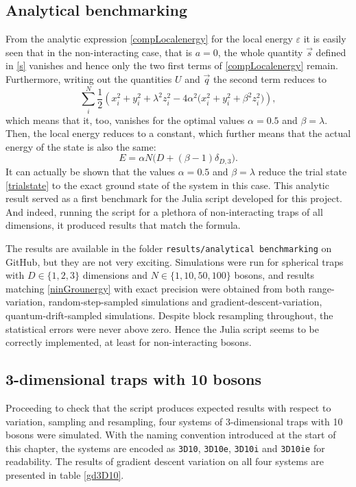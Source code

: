 \documentclass[a4paper,8pt]{article}
\begin{document}
\begin{multicols}{2}
\subsection{Analytical benchmarking}\label{benchmarking}
From the analytic expression \eqref{compLocalenergy} for the local energy $\varepsilon$ it is easily seen that in the non-interacting case, that is $a = 0$, the whole quantity $\vec{s}$ defined in \eqref{s} vanishes and hence only the two first terms of \eqref{compLocalenergy} remain. Furthermore, writing out the quantities $U$ and $\vec{q}$ the second term reduces to
\begin{equation}\nonumber
	\sum_i^N \frac{1}{2}\left(x^2_i+y^2_i+\lambda^2z^2_i-4\alpha^2\Big(x^2_i+y^2_i+\beta^2z_i^2\Big)\right),
\end{equation}
which means that it, too, vanishes for the optimal values $\alpha = 0.5$ and $\beta = \lambda$. Then, the local energy reduces to a constant, which further means that the actual energy of the state is also the same:
\begin{equation}\label{ninGrounergy}
 E = \alpha N \Big(D+(\beta-1)\delta_{D,3}\Big).
\end{equation}
It can actually be shown that the values $\alpha = 0.5$ and $\beta = \lambda$ reduce the trial state \eqref{trialstate} to the exact ground state of the system in this case.\cite{SWL} This analytic result served as a first benchmark for the Julia script developed for this project. And indeed, running the script for a plethora of non-interacting traps of all dimensions, it produced results that match the formula.

The results are available in the folder \texttt{results/analytical benchmarking} on GitHub, but they are not very exciting. Simulations were run for spherical traps with $D \in \{1,2,3\}$ dimensions and $N \in \{1,10,50,100\}$ bosons, and results matching \eqref{ninGrounergy} with exact precision were obtained from both range-variation, random-step-sampled simulations and gradient-descent-variation, quantum-drift-sampled simulations. Despite block resampling throughout, the statistical errors were never above zero. Hence the Julia script seems to be correctly implemented, at least for non-interacting bosons.

\subsection{3-dimensional traps with 10 bosons}\label{3D10}
Proceeding to check that the script produces expected results with respect to variation, sampling and resampling, four systems of 3-dimensional traps with 10 bosons were simulated. With the naming convention introduced at the start of this chapter, the systems are encoded as \texttt{3D10}, \texttt{3D10e}, \texttt{3D10i} and \texttt{3D10ie} for readability. The results of gradient descent variation on all four systems are presented in table \ref{gd3D10}.


\end{multicols}
\end{document}
